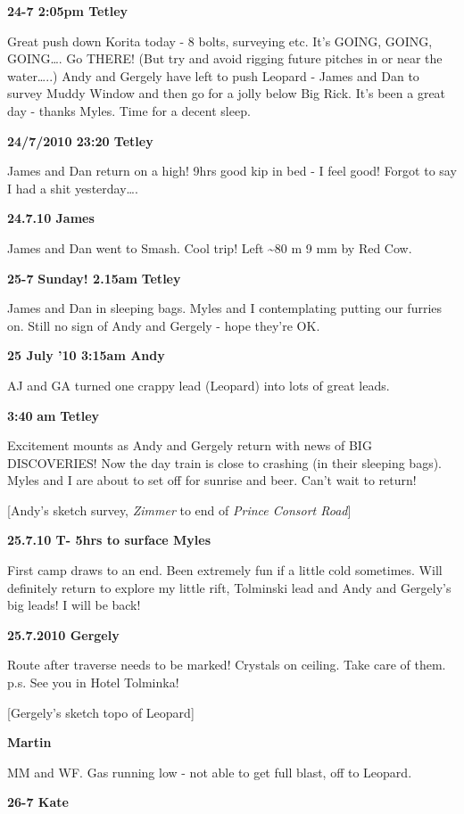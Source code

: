 \textbf{24-7 2:05pm Tetley}

Great push down Korita today - 8 bolts, surveying etc. It's GOING,
GOING, GOING\ldots{}. Go THERE! (But try and avoid rigging future
pitches in or near the water\ldots{}..) Andy and Gergely have left to
push Leopard - James and Dan to survey Muddy Window and then go for a
jolly below Big Rick. It's been a great day - thanks Myles. Time for a
decent sleep.

\textbf{24/7/2010 23:20 Tetley}

James and Dan return on a high! 9hrs good kip in bed - I feel good!
Forgot to say I had a shit yesterday\ldots{}.

\textbf{24.7.10 James}

James and Dan went to Smash. Cool trip! Left \textasciitilde 80 m 9 mm
by Red Cow.

\textbf{25-7} \textbf{Sunday! 2.15am} \textbf{Tetley}

James and Dan in sleeping bags. Myles and I contemplating putting our
furries on. Still no sign of Andy and Gergely - hope they're OK.

\textbf{25 July '10 3:15am Andy}

AJ and GA turned one crappy lead (Leopard) into lots of great leads.

\textbf{3:40} \textbf{am} \textbf{Tetley}

Excitement mounts as Andy and Gergely return with news of BIG
DISCOVERIES! Now the day train is close to crashing (in their sleeping
bags). Myles and I are about to set off for sunrise and beer. Can't wait
to return!

{[}Andy's sketch survey, \emph{Zimmer} to end of \emph{Prince Consort
Road}{]}

\textbf{25.7.10 T- 5hrs to surface Myles}

First camp draws to an end. Been extremely fun if a little cold
sometimes. Will definitely return to explore my little rift, Tolminski
lead and Andy and Gergely's big leads! I will be back!

\textbf{25.7.2010 Gergely}

Route after traverse needs to be marked! Crystals on ceiling. Take care
of them. p.s. See you in Hotel Tolminka!

{[}Gergely's sketch topo of Leopard{]}

\textbf{Martin}

MM and WF. Gas running low - not able to get full blast, off to Leopard.

\textbf{26-7 Kate}

